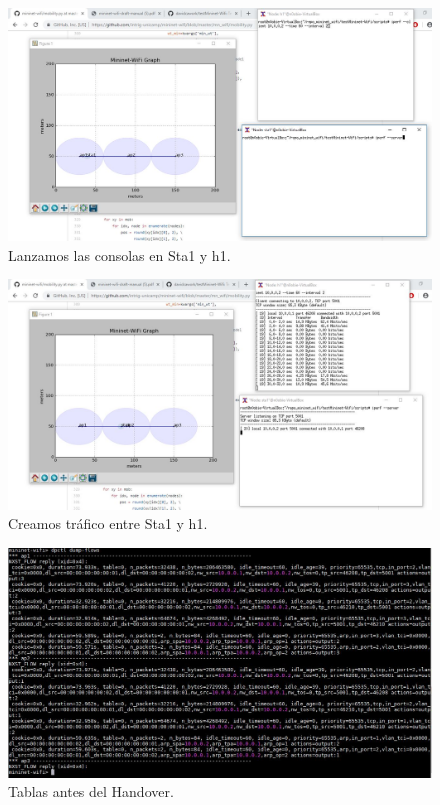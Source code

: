 \newpage
\begin{figure}[!htb]
  \centering
    \includegraphics[width=\linewidth]{./img/test/23.JPG}
    \caption{Lanzamos las consolas en Sta1 y h1.}
  \label{fig:yo}
\end{figure}
\begin{figure}[!htb]
  \centering
    \includegraphics[width=\linewidth]{./img/test/24.JPG}
    \caption{Creamos tráfico entre Sta1 y h1.}
  \label{fig:yo}
\end{figure}
\newpage
\begin{figure}[!htb]
  \centering
    \includegraphics[width=\linewidth]{./img/test/25.JPG}
    \caption{Tablas antes del Handover.}
  \label{fig:yo}
\end{figure}
